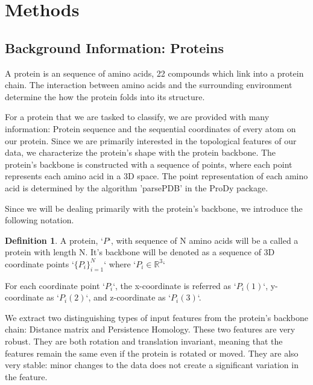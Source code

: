 \documentclass[12pt, a4paper, twocolumn, fullpage]{article}
\theoremstyle{plain}
\theoremstyle{definition}
\newtheorem{defn}{Definition}[section]
\theoremstyle{remark}
\begin{document}
\section{Methods}

\subsection{ Background Information: Proteins}
A protein is an sequence of amino acids, 22 compounds which link into a protein chain. The interaction between amino acids and the surrounding environment determine the how the protein folds into its structure.

For a protein that we are tasked to classify, we are provided with many information: Protein sequence and the sequential coordinates of every atom on our protein. Since we are primarily interested in the topological features of our data, we characterize the protein's shape with the protein backbone. The protein's backbone is constructed with a sequence of points, where each point represents each amino acid in a 3D space. The point representation of each amino acid is determined by the algorithm 'parsePDB' in the ProDy package. 

Since we will be dealing primarily with the protein's backbone, we introduce the following notation.
	
\begin{defn}
A protein, `$P$`, with sequence of N amino acids will be a called a protein with length N. It's backbone will be denoted as a sequence of 3D coordinate points `$ \{P_i\}^{N}_{i=1} $` where `$P_{i} \in \mathbb{R}^3 $`

For each coordinate point `$ P_{i} $`, the x-coordinate is referred as `$ P_{i}(1) $`, y-coordinate as `$ P_{i}(2) $`, and z-coordinate as `$ P_{i}(3) $`.
\end{defn}

We extract two distinguishing types of input features from the protein's backbone chain: Distance matrix and Persistence Homology. These two features are very robust. They are both rotation and translation invariant, meaning that the features remain the same even if the protein is rotated or moved. They are also very stable: minor changes to the data does not create a significant variation in the feature.
	
\end{document}
